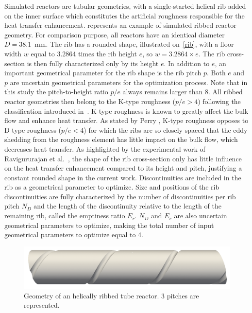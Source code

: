 Simulated reactors are tubular geometries, with a single-started helical rib added on the inner surface which constitutes the artificial roughness responsible for the heat transfer enhancement.  represents an example of simulated ribbed reactor geometry. For comparison purpose, all reactors have an identical diameter $D=38.1$~mm. The rib has a rounded shape, illustrated on~\cref{rib}, with a floor width $w$ equal to 3.2864 times the rib height $e$, so $w=3.2864 \times e$. The rib cross-section is then fully characterized only by its height $e$. In addition to $e$, an important geometrical parameter for the rib shape is the rib pitch $p$. Both $e$ and $p$ are uncertain geometrical parameters for the optimization process. Note that in this study the pitch-to-height ratio $p/e$ always remains larger than 8. All ribbed reactor geometries then belong to the K-type roughness ($p/e > 4$) following the classification introduced in~\cite{jimenez2004, nagano2004}. K-type roughness is known to greatly affect the bulk flow and enhance heat transfer. As stated by Perry \cite{perry1969}, K-type roughness opposes to D-type roughness ($p/e < 4$) for which the ribs are so closely spaced that the eddy shedding from the roughness element has little impact on the bulk flow, which decreases heat transfer. As highlighted by the experimental work of Ravigururajan et al.~\cite{ravigururajan1996}, the shape of the rib cross-section only has little influence on the heat transfer enhancement compared to its height and pitch, justifying a constant rounded shape in the current work. Discontinuities are included in the rib as a geometrical parameter to optimize. Size and positions of the rib discontinuities are fully characterized by the number of discontinuities per rib pitch $N_D$ and the length of the discontinuity relative to the length of the remaining rib, called the emptiness ratio $E_r$. $N_D$ and $E_r$ are also uncertain geometrical parameters to optimize, making the total number of input geometrical parameters to optimize equal to 4.\\

\begin{figure}[ht]
\centering
\includegraphics[width=0.8\linewidth]{fig/applications/optim/geometry.png}
\caption{Geometry of an helically ribbed tube reactor. 3 pitches are represented.}
\label{geometry}
\end{figure}

